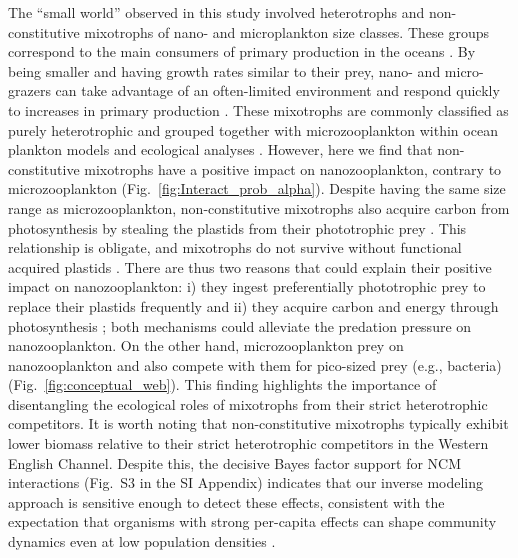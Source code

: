\documentclass[12pt]{article}
\begin{document}
The ``small world'' observed in this study involved heterotrophs and non-constitutive mixotrophs of nano- and microplankton size classes. These groups correspond to the main consumers of primary production in the oceans \citep{Schmoker2013}. By being smaller and having growth rates similar to their prey, nano- and micro-grazers can take advantage of an often-limited environment and respond quickly to increases in primary production \citep{Schmoker2013}. These mixotrophs are commonly classified as purely heterotrophic and grouped together with microzooplankton within ocean plankton models \citep{butenschon2016ersem, Ward2016} and ecological analyses \citep{segura2017community}. However, here we find that non-constitutive mixotrophs have a positive impact on nanozooplankton, contrary to microzooplankton (Fig.~\ref{fig:Interact_prob_alpha}). Despite having the same size range as microzooplankton, non-constitutive mixotrophs also acquire carbon from photosynthesis by stealing the plastids from their phototrophic prey \citep{johnson2023functional}. This relationship is obligate, and mixotrophs do not survive without functional acquired plastids \citep{McManus2012}. There are thus two reasons that could explain their positive impact on nanozooplankton: i) they ingest preferentially phototrophic prey to replace their plastids frequently \citep{Dolan2000} and ii) they acquire carbon and energy through photosynthesis \citep{johnson2023functional}; both mechanisms could alleviate the predation pressure on nanozooplankton. On the other hand, microzooplankton prey on nanozooplankton and also compete with them for pico-sized prey (e.g., bacteria) (Fig.~\ref{fig:conceptual_web}). This finding highlights the importance of disentangling the ecological roles of mixotrophs from their strict heterotrophic competitors. It is worth noting that non-constitutive mixotrophs typically exhibit lower biomass relative to their strict heterotrophic competitors in the Western English Channel. Despite this, the decisive Bayes factor support for NCM interactions (Fig.~S3 in the SI Appendix) indicates that our inverse modeling approach is sensitive enough to detect these effects, consistent with the expectation that organisms with strong per-capita effects can shape community dynamics even at low population densities \citep{Paine1966}.
\end{document}
